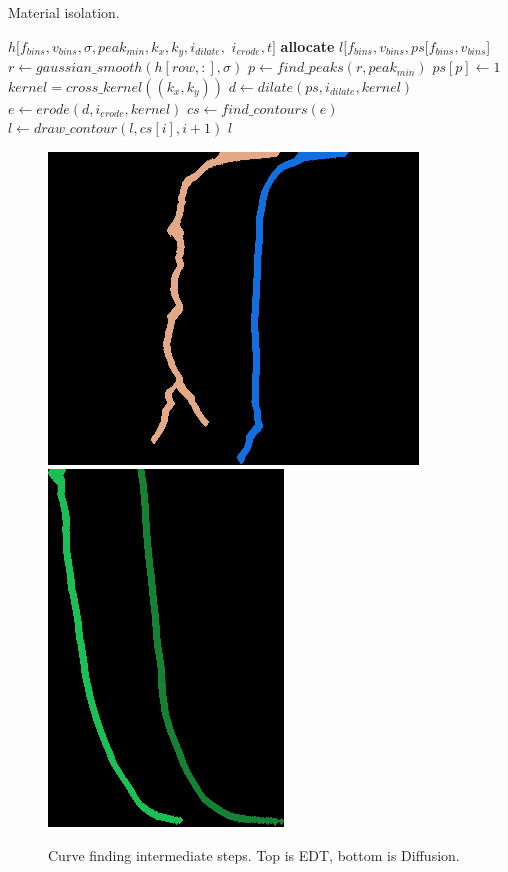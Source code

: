\begin{algorithm}
    \caption{Material isolation.}
    \label{alg:material}
    \begin{algorithmic}
         {$h[f_{bins},v_{bins},\sigma, peak_{min}, k_x, k_y, i_{dilate},$ \newline $i_{erode}, t]$}
            \State \textbf{allocate} $l[f_{bins},v_{bins}, ps[f_{bins},v_{bins}$]
                \State $r \gets gaussian\_smooth(h[row,:], \sigma)$
                \State $p \gets find\_peaks(r, peak_{min})$
                \State $ps[p] \gets 1$
            \EndFor
            \State $kernel = cross\_kernel((k_x, k_y))$
            \State $d \gets dilate(ps, i_{dilate}, kernel)$
            \State $e \gets erode(d, i_{erode}, kernel)$
            \State $cs \gets find\_contours(e)$
                    \State $l \gets draw\_contour(l, cs[i], i+1)$
                \EndIf
            \EndFor
            \Return $l$
        \EndFunction
    \end{algorithmic}
\end{algorithm}

\begin{figure}
    \includegraphics[width=0.5\linewidth]{figures/curves_edt.png}%
    \includegraphics[width=0.5\linewidth]{figures/curves_diffusion.png}
    \caption{Curve finding intermediate steps. Top is EDT, bottom is Diffusion.}
    \label{fig:curves}
\end{figure}

